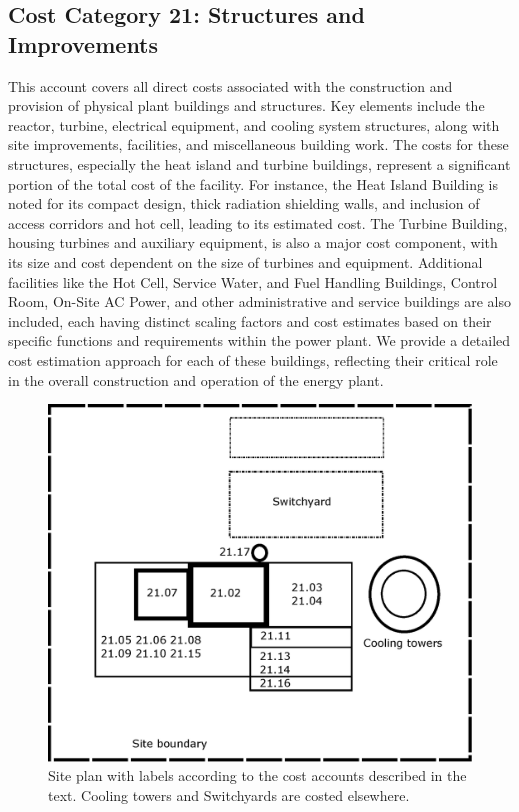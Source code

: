 
\subsection{Cost Category 21: Structures and Improvements}

This account covers all direct costs associated with the construction and provision of physical plant buildings and structures. Key elements include the reactor, turbine, electrical equipment, and cooling system structures, along with site improvements, facilities, and miscellaneous building work. The costs for these structures, especially the heat island and turbine buildings, represent a significant portion of the total cost of the facility. For instance, the Heat Island Building is noted for its compact design, thick radiation shielding walls, and inclusion of access corridors and hot cell, leading to its estimated cost. The Turbine Building, housing turbines and auxiliary equipment, is also a major cost component, with its size and cost dependent on the size of turbines and equipment. Additional facilities like the Hot Cell, Service Water, and Fuel Handling Buildings, Control Room, On-Site AC Power, and other administrative and service buildings are also included, each having distinct scaling factors and cost estimates based on their specific functions and requirements within the power plant. We provide a detailed cost estimation approach for each of these buildings, reflecting their critical role in the overall construction and operation of the energy plant.\\

\begin{figure}[h!] 
\centering 
\includegraphics[scale=0.6]{StandardFigures/siteplan2023.eps} 
\caption{Site plan with labels according to the cost accounts described in the text.  Cooling towers and Switchyards are costed elsewhere.} 
\label{fig:site} 
\end{figure} 



